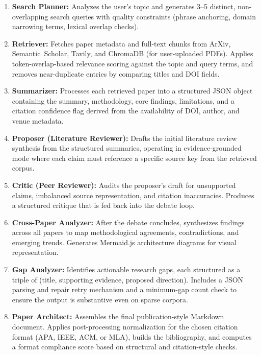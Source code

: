 \documentclass[12pt, a4paper]{article}
\begin{document}
\begin{enumerate}[leftmargin=*, itemsep=4pt]
    \item \textbf{Search Planner:} Analyzes the user's topic and generates 3--5 distinct,
          non-overlapping search queries with quality constraints (phrase anchoring, domain
          narrowing terms, lexical overlap checks).

    \item \textbf{Retriever:} Fetches paper metadata and full-text chunks from ArXiv,
          Semantic~Scholar, Tavily, and ChromaDB (for user-uploaded PDFs). Applies
          token-overlap-based relevance scoring against the topic and query terms, and
          removes near-duplicate entries by comparing titles and DOI fields.

    \item \textbf{Summarizer:} Processes each retrieved paper into a structured JSON object
          containing the summary, methodology, core findings, limitations, and a citation
          confidence flag derived from the availability of DOI, author, and venue metadata.

    \item \textbf{Proposer (Literature Reviewer):} Drafts the initial literature review
          synthesis from the structured summaries, operating in evidence-grounded mode where
          each claim must reference a specific source key from the retrieved corpus.

    \item \textbf{Critic (Peer Reviewer):} Audits the proposer's draft for unsupported
          claims, imbalanced source representation, and citation inaccuracies. Produces a
          structured critique that is fed back into the debate loop.

    \item \textbf{Cross-Paper Analyzer:} After the debate concludes, synthesizes findings
          across all papers to map methodological agreements, contradictions, and emerging
          trends. Generates Mermaid.js architecture diagrams for visual representation.

    \item \textbf{Gap Analyzer:} Identifies actionable research gaps, each structured as a
          triple of (title, supporting evidence, proposed direction). Includes a JSON
          parsing and repair retry mechanism and a minimum-gap count check to ensure the
          output is substantive even on sparse corpora.

    \item \textbf{Paper Architect:} Assembles the final publication-style Markdown document.
          Applies post-processing normalization for the chosen citation format (APA, IEEE,
          ACM, or MLA), builds the bibliography, and computes a format compliance score
          based on structural and citation-style checks.
\end{enumerate}
\end{document}
